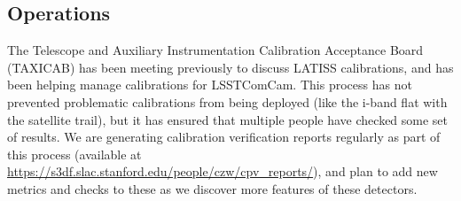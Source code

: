 \subsection{Operations}

The Telescope and Auxiliary Instrumentation Calibration Acceptance Board (TAXICAB) has been meeting previously to discuss LATISS calibrations, and has been helping manage calibrations for LSSTComCam.
This process has not prevented problematic calibrations from being deployed (like the i-band flat with the satellite trail), but it has ensured that multiple people have checked some set of results.
We are generating calibration verification reports regularly as part of this process (available at \url{https://s3df.slac.stanford.edu/people/czw/cpv_reports/}), and plan to add new metrics and checks to these as we discover more features of these detectors.
